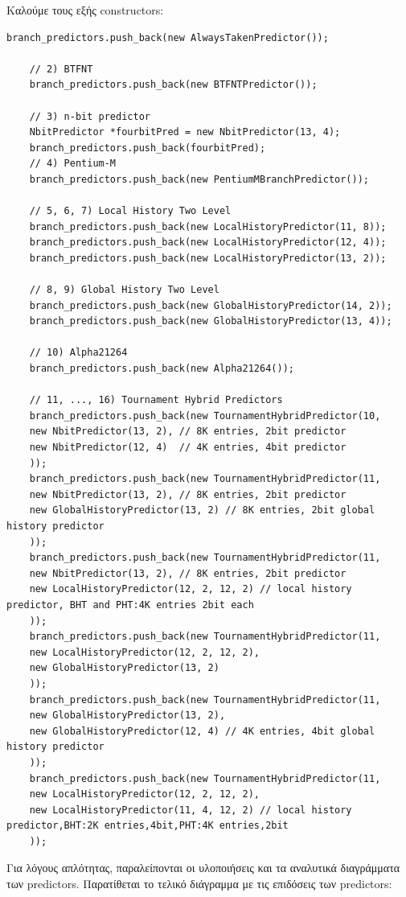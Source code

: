 \documentclass{article}
\begin{document}
Καλούμε τους εξής constructors:

\begin{lstlisting}[style=cppstyle]
    branch_predictors.push_back(new AlwaysTakenPredictor());
    
    // 2) BTFNT
    branch_predictors.push_back(new BTFNTPredictor());
    
    // 3) n-bit predictor
    NbitPredictor *fourbitPred = new NbitPredictor(13, 4);
    branch_predictors.push_back(fourbitPred);
    // 4) Pentium-M 
    branch_predictors.push_back(new PentiumMBranchPredictor());    

    // 5, 6, 7) Local History Two Level
    branch_predictors.push_back(new LocalHistoryPredictor(11, 8));
    branch_predictors.push_back(new LocalHistoryPredictor(12, 4));
    branch_predictors.push_back(new LocalHistoryPredictor(13, 2));

    // 8, 9) Global History Two Level
    branch_predictors.push_back(new GlobalHistoryPredictor(14, 2));
    branch_predictors.push_back(new GlobalHistoryPredictor(13, 4));
    
    // 10) Alpha21264
    branch_predictors.push_back(new Alpha21264());
    
    // 11, ..., 16) Tournament Hybrid Predictors
    branch_predictors.push_back(new TournamentHybridPredictor(10, 
	new NbitPredictor(13, 2), // 8K entries, 2bit predictor
	new NbitPredictor(12, 4)  // 4K entries, 4bit predictor
    ));
    branch_predictors.push_back(new TournamentHybridPredictor(11,
	new NbitPredictor(13, 2), // 8K entries, 2bit predictor
	new GlobalHistoryPredictor(13, 2) // 8K entries, 2bit global history predictor
    ));
    branch_predictors.push_back(new TournamentHybridPredictor(11,
	new NbitPredictor(13, 2), // 8K entries, 2bit predictor
	new LocalHistoryPredictor(12, 2, 12, 2) // local history predictor, BHT and PHT:4K entries 2bit each
    ));
    branch_predictors.push_back(new TournamentHybridPredictor(11,
	new LocalHistoryPredictor(12, 2, 12, 2),
	new GlobalHistoryPredictor(13, 2)
    ));
    branch_predictors.push_back(new TournamentHybridPredictor(11,
	new GlobalHistoryPredictor(13, 2),
	new GlobalHistoryPredictor(12, 4) // 4K entries, 4bit global history predictor
    ));
    branch_predictors.push_back(new TournamentHybridPredictor(11,
	new LocalHistoryPredictor(12, 2, 12, 2),
	new LocalHistoryPredictor(11, 4, 12, 2) // local history predictor,BHT:2K entries,4bit,PHT:4K entries,2bit
    ));
\end{lstlisting}

Για λόγους απλότητας, παραλείπονται οι υλοποιήσεις και τα αναλυτικά διαγράμματα των predictors.
Παρατίθεται το τελικό διάγραμμα με τις επιδόσεις των predictors:
\end{document}

